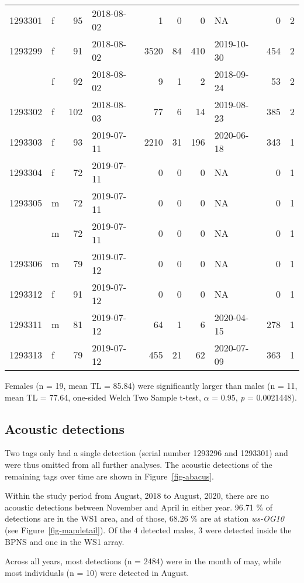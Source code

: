 \documentclass[
  authoryear,
  review,
  3p]{elsarticle}
\begin{document}
\begin{table}[H]
\begin{tabular}{llrlrrrlrr}
1293301 & f & 95 & 2018-08-02 & 1 & 0 & 0 & NA & 0 & 2\\
1293299 & f & 91 & 2018-08-02 & 3520 & 84 & 410 & 2019-10-30 & 454 & 2\\
\addlinespace
1293309 & f & 92 & 2018-08-02 & 9 & 1 & 2 & 2018-09-24 & 53 & 2\\
1293302 & f & 102 & 2018-08-03 & 77 & 6 & 14 & 2019-08-23 & 385 & 2\\
1293303 & f & 93 & 2019-07-11 & 2210 & 31 & 196 & 2020-06-18 & 343 & 1\\
1293304 & f & 72 & 2019-07-11 & 0 & 0 & 0 & NA & 0 & 1\\
1293305 & m & 72 & 2019-07-11 & 0 & 0 & 0 & NA & 0 & 1\\
\addlinespace
1293310 & m & 72 & 2019-07-11 & 0 & 0 & 0 & NA & 0 & 1\\
1293306 & m & 79 & 2019-07-12 & 0 & 0 & 0 & NA & 0 & 1\\
1293312 & f & 91 & 2019-07-12 & 0 & 0 & 0 & NA & 0 & 1\\
1293311 & m & 81 & 2019-07-12 & 64 & 1 & 6 & 2020-04-15 & 278 & 1\\
1293313 & f & 79 & 2019-07-12 & 455 & 21 & 62 & 2020-07-09 & 363 & 1\\
\bottomrule
\end{tabular}
\end{table}

Females (n = 19, mean TL = 85.84) were significantly larger than males
(n = 11, mean TL = 77.64, one-sided Welch Two Sample t-test, \(\alpha\)
= 0.95, \emph{p} = 0.0021448).

\hypertarget{acoustic-detections-1}{%
\subsection{Acoustic detections}\label{acoustic-detections-1}}

Two tags only had a single detection (serial number 1293296 and 1293301)
and were thus omitted from all further analyses. The acoustic detections
of the remaining tags over time are shown in Figure~\ref{fig-abacus}.

Within the study period from August, 2018 to August, 2020, there are no
acoustic detections between November and April in either year. 96.71 \%
of detections are in the WS1 area, and of those, 68.26 \% are at station
\emph{ws-OG10} (see Figure~\ref{fig-mapdetail}). Of the 4 detected
males, 3 were detected inside the BPNS and one in the WS1 array.

Across all years, most detections (n = 2484) were in the month of may,
while most individuals (n = 10) were detected in August.
\end{document}
